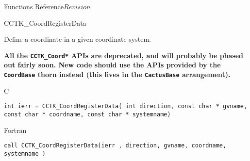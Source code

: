 \begin{cactuspart}{ Functions Reference}{}{$Revision$}

\begin{FunctionDescription}{CCTK\_CoordRegisterData}%
{Define a coordinate in a given coordinate system.

\textbf{All the \texttt{CCTK\_Coord*} APIs are deprecated,
and will probably be phased out fairly soon.
New code should use the APIs provided by the \texttt{CoordBase} thorn
instead (this lives in the \texttt{CactusBase} arrangement).}
}
\label{CCTK-CoordRegisterData}
\begin{SynopsisSection}
\begin{Synopsis}{C}
\begin{verbatim}int ierr = CCTK_CoordRegisterData( int direction, const char * gvname, const char * coordname, const char * systemname)\end{verbatim}
\end{Synopsis}
\begin{Synopsis}{Fortran}
\begin{verbatim}call CCTK_CoordRegisterData(ierr , direction, gvname, coordname, systemname )


\end{verbatim}
\end{Synopsis}
\end{SynopsisSection}
\end{FunctionDescription}
\end{cactuspart}
